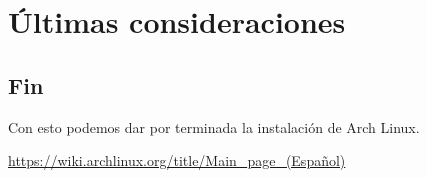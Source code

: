 \section{Últimas consideraciones}
\subsection{Fin}

    Con esto podemos dar por terminada la instalación de Arch Linux.\vspace{5mm}

    \begin{tcolorbox}[title=En caso de dudas siempre se puede consultar su wiki en español]
      \url{https://wiki.archlinux.org/title/Main_page_(Español)}
    \end{tcolorbox}

